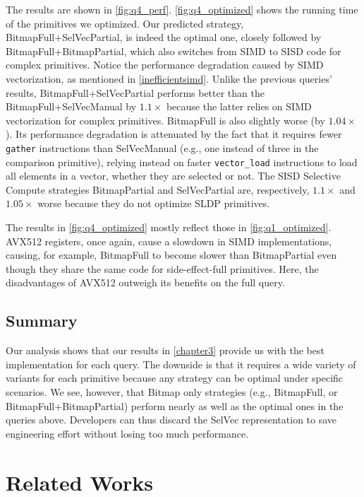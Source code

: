 \documentclass[12pt]{cmuthesis}
\begin{document}
The results are shown in \cref{fig:q4_perf}. \cref{fig:q4_optimized} shows the running time of the primitives we optimized. Our predicted strategy, BitmapFull+SelVecPartial, is indeed the optimal one, closely followed by BitmapFull+BitmapPartial, which also switches from SIMD to SISD code for complex primitives. Notice the performance degradation caused by SIMD vectorization, as mentioned in \cref{inefficientsimd}. Unlike the previous queries' results, BitmapFull+SelVecPartial performs better than the BitmapFull+SelVecManual by $1.1\times$ because the latter relies on SIMD vectorization for complex primitives. BitmapFull is also slightly worse (by $1.04\times$). Its performance degradation is attenuated by the fact that it requires fewer \texttt{gather} instructions than SelVecManual (e.g., one instead of three in the comparison primitive), relying instead on faster \texttt{vector\_load} instructions to load all elements in a vector, whether they are selected or not. The SISD Selective Compute strategies BitmapPartial and SelVecPartial are, respectively, $1.1\times$ and $1.05\times$ worse because they do not optimize SLDP primitives. 

The results in \cref{fig:q4_optimized} mostly reflect those in \cref{fig:q1_optimized}. AVX512 registers, once again, cause a slowdown in SIMD implementations, causing, for example, BitmapFull to become slower than BitmapPartial even though they share the same code for side-effect-full primitives. Here, the disadvantages of AVX512 outweigh its benefits on the full query.

\section{Summary}
Our analysis shows that our results in \cref{chapter3} provide us with the best implementation for each query. The downside is that it requires a wide variety of variants for each primitive because any strategy can be optimal under specific scenarios. We see, however, that Bitmap only strategies (e.g., BitmapFull, or BitmapFull+BitmapPartial) perform nearly as well as the optimal ones in the queries above. Developers can thus discard the SelVec representation to save engineering effort without losing too much performance.


\chapter{Related Works}
\label{chapter5}
\end{document}

